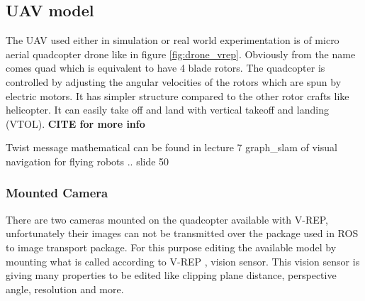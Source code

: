 \vfill
\hfill

\subsection{UAV model}

The UAV used either in simulation or real world experimentation is of micro aerial quadcopter drone like in figure \ref{fig:drone_vrep}. Obviously from the name comes quad which is equivalent to have 4 blade rotors. The quadcopter is controlled by adjusting the angular velocities of the rotors which are spun by electric motors. It has simpler structure compared to the other rotor crafts like helicopter. It can easily take off and land with vertical takeoff and landing (VTOL).  \textbf{CITE for more info}



Twist message mathematical can be found in lecture 7 graph\_slam of visual navigation for flying robots .. slide 50

\subsubsection{Mounted Camera}

There are two cameras mounted on the quadcopter available with V-REP, unfortunately their images can not be transmitted over the package used in ROS to image transport package. For this purpose editing the available model by mounting what is called according to V-REP , vision sensor. This vision sensor is giving many properties to be edited like clipping plane distance, perspective angle, resolution and more. 

  

  



